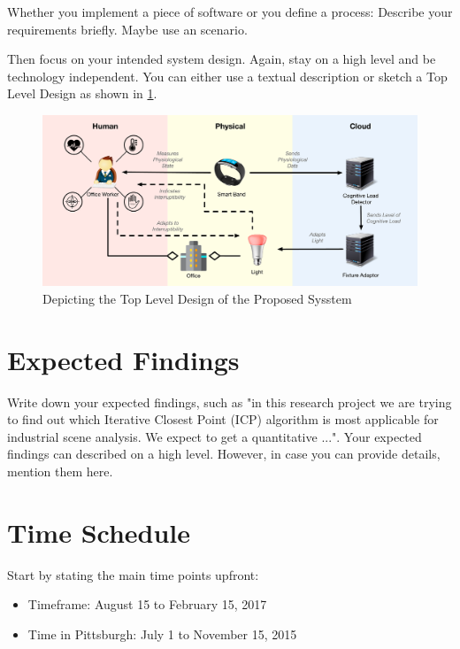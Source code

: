 \documentclass[a4paper]{article}
\begin{document}
Whether you implement a piece of software or you define a process:
Describe your requirements briefly.
Maybe use an scenario.

Then focus on your intended system design.
Again, stay on a high level and be technology independent.
You can either use a textual description or sketch a Top Level Design as shown in \ref{fig:top-level-design}.

\begin{figure}[h]
	\centering
	\includegraphics[width=\textwidth]{top-level-design.pdf}
	\caption{Depicting the Top Level Design of the Proposed Sysstem}
	\label{fig:top-level-design}
\end{figure}

\section{Expected Findings}

Write down your expected findings, such as "in this research project we are trying to find out which Iterative Closest Point (ICP) algorithm is most applicable for industrial scene analysis. We expect to get a quantitative ...".
Your expected findings can described on a high level.
However, in case you can provide details, mention them here.

\section*{Time Schedule}
Start by stating the main time points upfront:

\begin{itemize}
	\item Timeframe: August 15 to February 15, 2017
	\item Time in Pittsburgh: July 1 to November 15, 2015
\end{itemize}
\end{document}
